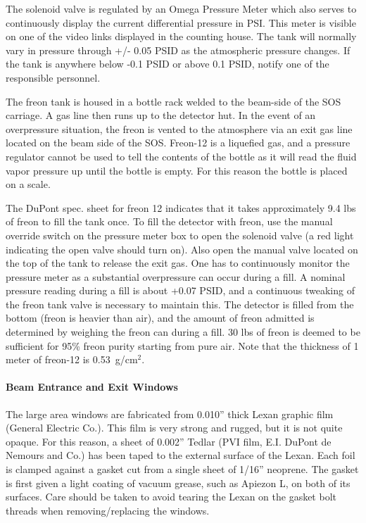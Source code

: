 The solenoid valve is regulated by an Omega Pressure Meter which also
serves to continuously display the current differential pressure in
PSI. This meter is visible on one of the video links displayed in the
counting house.  The tank will normally vary in pressure through +/-
0.05 PSID as the atmospheric pressure changes.  If the tank is
anywhere below -0.1 PSID or above 0.1 PSID, notify one of the
responsible personnel.

	The freon tank is housed in a bottle rack welded to the
beam-side of the SOS carriage.  A gas line then runs up to the detector
hut.  In the event of an overpressure situation, the freon is vented to
the atmosphere via an exit gas line located on the beam side of the SOS.
Freon-12 is a liquefied gas, and a pressure
regulator cannot be used to tell the contents of the bottle as it will
read the fluid vapor pressure up until the bottle is empty. For this
reason the bottle is placed on a scale.

	The DuPont spec. sheet for freon 12 indicates that it takes
approximately 9.4 lbs of freon to fill the tank once.  To fill the
detector with freon, use the manual override switch on the pressure
meter box to open the solenoid valve (a red light indicating the open
valve should turn on).  Also open the manual valve located on the top
of the tank to release the exit gas.  One has to continuously monitor
the pressure meter as a substantial overpressure can occur during a
fill.  A nominal pressure reading during a fill is about +0.07 PSID,
and a continuous tweaking of the freon tank valve is necessary to
maintain this.  The detector is filled from the bottom (freon is
heavier than air), and the
amount of freon admitted is determined by weighing the freon can
during a fill.  30 lbs of freon is deemed to be sufficient for 95\%
freon purity starting from pure air.
Note that the thickness of 1 meter of freon-12 is 0.53~g/cm$^{2}$.

\paragraph{Beam Entrance and Exit Windows}

	The large area windows are fabricated from 0.010'' thick Lexan
graphic film (General Electric Co.).  This film is very strong and
rugged, but it is not quite opaque.  For this reason, a sheet of
0.002'' Tedlar (PVI film, E.I. DuPont de Nemours and Co.) has been
taped to the external surface of the Lexan.  Each foil is clamped
against a gasket cut from a single sheet of 1/16'' neoprene.  The
gasket is first given a light coating of vacuum grease, such as
Apiezon L, on both of its surfaces.  Care should be taken to avoid
tearing the Lexan on the gasket bolt threads when removing/replacing the
windows.

